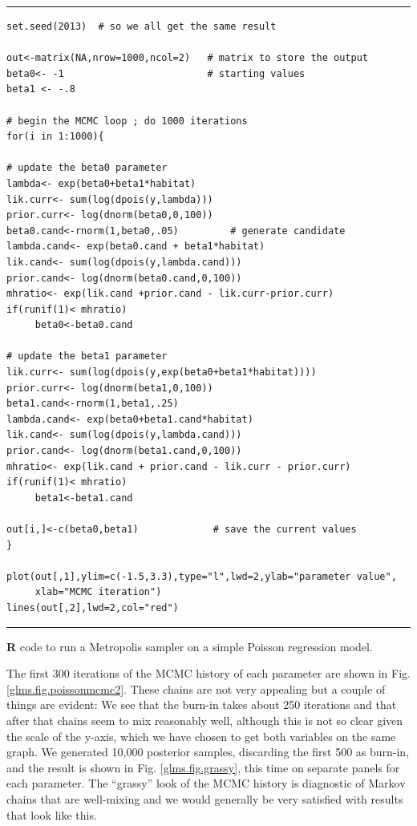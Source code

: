 \begin{panel}[htp]
\centering
\rule[0.15in]{\textwidth}{.03in}
{\small
\begin{verbatim}
set.seed(2013)  # so we all get the same result

out<-matrix(NA,nrow=1000,ncol=2)   # matrix to store the output
beta0<- -1                         # starting values
beta1 <- -.8

# begin the MCMC loop ; do 1000 iterations
for(i in 1:1000){

# update the beta0 parameter
lambda<- exp(beta0+beta1*habitat)
lik.curr<- sum(log(dpois(y,lambda)))
prior.curr<- log(dnorm(beta0,0,100))
beta0.cand<-rnorm(1,beta0,.05)         # generate candidate
lambda.cand<- exp(beta0.cand + beta1*habitat)
lik.cand<- sum(log(dpois(y,lambda.cand)))
prior.cand<- log(dnorm(beta0.cand,0,100))
mhratio<- exp(lik.cand +prior.cand - lik.curr-prior.curr)
if(runif(1)< mhratio)
     beta0<-beta0.cand

# update the beta1 parameter
lik.curr<- sum(log(dpois(y,exp(beta0+beta1*habitat))))
prior.curr<- log(dnorm(beta1,0,100))
beta1.cand<-rnorm(1,beta1,.25)
lambda.cand<- exp(beta0+beta1.cand*habitat)
lik.cand<- sum(log(dpois(y,lambda.cand)))
prior.cand<- log(dnorm(beta1.cand,0,100))
mhratio<- exp(lik.cand + prior.cand - lik.curr - prior.curr)
if(runif(1)< mhratio)
     beta1<-beta1.cand

out[i,]<-c(beta0,beta1)             # save the current values
}

plot(out[,1],ylim=c(-1.5,3.3),type="l",lwd=2,ylab="parameter value",
     xlab="MCMC iteration")
lines(out[,2],lwd=2,col="red")
\end{verbatim}
}
\rule[-0.15in]{\textwidth}{.03in}
\caption{
{\bf R} code to run a Metropolis sampler on a simple Poisson regression model.
}
\label{glms.panel.poisreg}
\end{panel}

The first 300 iterations of the MCMC history of each parameter
are shown in Fig. \ref{glms.fig.poissonmcmc2}. These chains are
not very appealing but a couple of things are evident: 
We see
that the burn-in takes about 250 iterations and that after that chains seem to mix 
reasonably well, although this is not so clear given the scale of the
y-axis, which we have chosen to get both variables on the same graph.
We generated 10,000 posterior samples,
discarding the first 500 as burn-in, and the result is shown in
Fig. \ref{glms.fig.grassy}, this time on separate panels for each
parameter.
The ``grassy''
look of the MCMC history is diagnostic of Markov chains that are
well-mixing and we would generally be very satisfied with results that
look like this.

